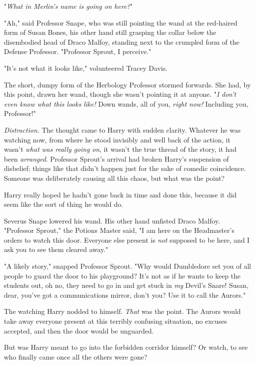 "\emph{What in Merlin's name is going on here?}"

"Ah," said Professor Snape, who was still pointing the wand at the red-haired 
form of Susan Bones, his other hand still grasping the collar below the 
disembodied head of Draco Malfoy, standing next to the crumpled form of the 
Defense Professor. "Professor Sprout, I perceive."

"It's not what it looks like," volunteered Tracey Davis.

The short, dumpy form of the Herbology Professor stormed forwards. She had, by 
this point, drawn her wand, though she wasn't pointing it at anyone. "\emph{I 
don't even know what this looks like!} Down wands, all of you, \emph{right 
now!} Including you, Professor!"

\emph{Distraction.} The thought came to Harry with sudden clarity. Whatever he 
was watching now, from where he stood invisibly and well back of the action, it 
wasn't \emph{what was really going on}, it wasn't the true thread of the story, 
it had been \emph{arranged}. Professor Sprout's arrival had broken Harry's 
suspension of disbelief; things like that didn't happen just for the sake of 
comedic coincidence. Someone was deliberately causing all this chaos, but what 
was the point?

Harry really hoped he hadn't gone back in time and done this, because it did 
seem like the sort of thing he would do.

Severus Snape lowered his wand. His other hand unfisted Draco Malfoy. 
"Professor Sprout," the Potions Master said, "I am here on the Headmaster's 
orders to watch this door. Everyone else present is \emph{not} supposed to be 
here, and I ask you to see them cleared away."

"A likely story," snapped Professor Sprout. "Why would Dumbledore set you of 
all people to guard the door to his playground? It's not as if he wants to keep 
the students out, oh no, they need to go in and get stuck in \emph{my} Devil's 
Snare! Susan, dear, you've got a communications mirror, don't you? Use it to 
call the Aurors."

The watching Harry nodded to himself. \emph{That} was the point. The Aurors 
would take away everyone present at this terribly confusing situation, no 
excuses accepted, and then the door would be unguarded.

But was Harry meant to go into the forbidden corridor himself? Or watch, to see 
who finally came once all the others were gone?

